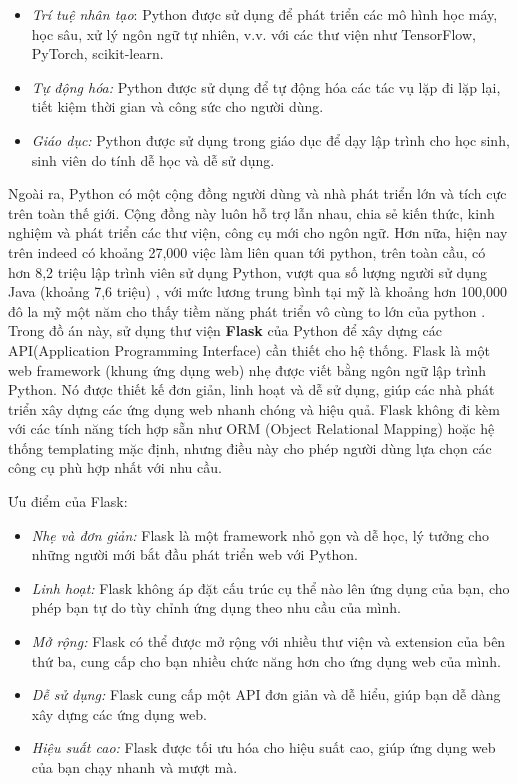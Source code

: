\begin{itemize}
\begin{itemize}
            \item \textit{Trí tuệ nhân tạo}: Python được sử dụng để phát triển các mô hình học máy, học sâu, xử lý ngôn ngữ tự nhiên, v.v. với các thư viện như TensorFlow, PyTorch, scikit-learn.
            \item \textit{Tự động hóa:} Python được sử dụng để tự động hóa các tác vụ lặp đi lặp lại, tiết kiệm thời gian và công sức cho người dùng.
            \item \textit{Giáo dục: }Python được sử dụng trong giáo dục để dạy lập trình cho học sinh, sinh viên do tính dễ học và dễ sử dụng.
        \end{itemize}
\end{itemize}
Ngoài ra, Python có một cộng đồng người dùng và nhà phát triển lớn và tích cực trên toàn thế giới. Cộng đồng này luôn hỗ trợ lẫn nhau, chia sẻ kiến thức, kinh nghiệm và phát triển các thư viện, công cụ mới cho ngôn ngữ. Hơn nữa, hiện nay trên indeed có khoảng 27,000 việc làm liên quan tới python, trên toàn cầu, có hơn 8,2 triệu lập trình viên sử dụng Python, vượt qua số lượng người sử dụng Java (khoảng 7,6 triệu) \cite{zdnet} , với mức lương trung bình tại mỹ là khoảng hơn 100,000 đô la mỹ một năm cho thấy tiềm năng phát triển vô cùng to lớn của python .\\
Trong đồ án này, sử dụng thư viện \textbf{Flask} của Python để xây dựng các API(Application Programming Interface) cần thiết cho hệ thống. Flask là một web framework (khung ứng dụng web) nhẹ được viết bằng ngôn ngữ lập trình Python. Nó được thiết kế đơn giản, linh hoạt và dễ sử dụng, giúp các nhà phát triển xây dựng các ứng dụng web nhanh chóng và hiệu quả. Flask không đi kèm với các tính năng tích hợp sẵn như ORM (Object Relational Mapping) hoặc hệ thống templating mặc định, nhưng điều này cho phép người dùng lựa chọn các công cụ phù hợp nhất với nhu cầu.

Ưu điểm của Flask:
\begin{itemize}
    \item \textit{Nhẹ và đơn giản:} Flask là một framework nhỏ gọn và dễ học, lý tưởng cho những người mới bắt đầu phát triển web với Python.
    \item \textit{Linh hoạt:} Flask không áp đặt cấu trúc cụ thể nào lên ứng dụng của bạn, cho phép bạn tự do tùy chỉnh ứng dụng theo nhu cầu của mình.
    \item \textit{Mở rộng:} Flask có thể được mở rộng với nhiều thư viện và extension của bên thứ ba, cung cấp cho bạn nhiều chức năng hơn cho ứng dụng web của mình.
    \item \textit{Dễ sử dụng:} Flask cung cấp một API đơn giản và dễ hiểu, giúp bạn dễ dàng xây dựng các ứng dụng web.
    \item \textit{Hiệu suất cao:} Flask được tối ưu hóa cho hiệu suất cao, giúp ứng dụng web của bạn chạy nhanh và mượt mà.
\end{itemize}

